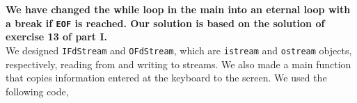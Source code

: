 \documentclass[12pt]{article}
\begin{document}
\textbf{We have changed the while loop in the main into an eternal loop with a break if \texttt{EOF} is reached. Our solution is based on the solution of exercise 13 of part I.}\\

We designed \texttt{IFdStream} and \texttt{OFdStream}, which are \texttt{istream} and \texttt{ostream} objects, respectively, reading from and writing to streams. We also made a main function that copies information entered at the keyboard to the screen. We used the following code,












\clearpage
\end{document}
